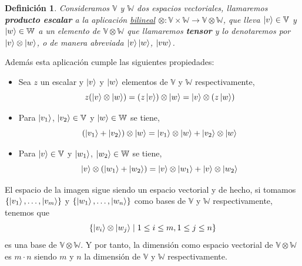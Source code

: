 \documentclass[a4paper]{article}
\newtheorem{deff}{Definición}[section]
\numberwithin{equation}{section}
\begin{document}
\begin{deff}
Consideramos $\mathbb{V}$ y $\mathbb{W}$ dos espacios vectoriales, llamaremos \textbf{producto escalar} a la aplicación \underline{bilineal} $\otimes : \mathbb{V}\times \mathbb{W} \longrightarrow \mathbb{V}\otimes \mathbb{W}$, que lleva $\ket{v} \in \mathbb{V}$ y $\ket{w} \in \mathbb{W}$ a un elemento de $\mathbb{V} \otimes \mathbb{W}$ que llamaremos \textbf{tensor} y lo denotaremos por $\ket{v}\otimes \ket{w}$, o de manera abreviada $\ket{v}\ket{w}$, $\ket{vw}$.
\end{deff}
Además esta aplicación cumple las siguientes propiedades:
\begin{itemize}
\item Sea $z$ un escalar y $\ket{v}$ y $\ket{w}$ elementos de $\mathbb{V}$ y $\mathbb{W}$ respectivamente,
\begin{equation}
z(\ket{v}\otimes\ket{w}) = (z\ket{v})\otimes\ket{w} = \ket{v}\otimes(z\ket{w})
\end{equation}

\item Para $\ket{v_1}$, $\ket{v_2} \in \mathbb{V}$ y $\ket{w} \in \mathbb{W}$ se tiene,
\begin{equation}
(\ket{v_1} + \ket{v_2}) \otimes \ket{w} = \ket{v_1}\otimes\ket{w} + \ket{v_2}\otimes\ket{w}
\end{equation}

\item Para $\ket{v} \in \mathbb{V}$ y $\ket{w_1}$, $\ket{w_2} \in \mathbb{W}$ se tiene,
\begin{equation}
\ket{v}\otimes (\ket{w_1} +  \ket{w_2}) = \ket{v}\otimes\ket{w_1} + \ket{v}\otimes\ket{w_2}
\end{equation}

\end{itemize}

El espacio de la imagen sigue siendo un espacio vectorial y de hecho, si tomamos $\lbrace \ket{v_1}, \ldots, \ket{v_m} \rbrace$ y $\lbrace \ket{w_1}, \ldots, \ket{w_n} \rbrace$ como bases de $\mathbb{V}$ y $\mathbb{W}$ respectivamente, tenemos que
\begin{equation}
\lbrace \ket{v_i}\otimes\ket{w_j} \mid 1\leq i \leq m, 1\leq j \leq n \rbrace
\end{equation}
es una base de $\mathbb{V}\otimes\mathbb{W}$. Y por tanto, la dimensión como espacio vectorial de $\mathbb{V}\otimes\mathbb{W}$ es $m\cdot n$ siendo $m$ y $n$ la dimensión de $\mathbb{V}$ y $\mathbb{W}$ respectivamente.
\end{document}
